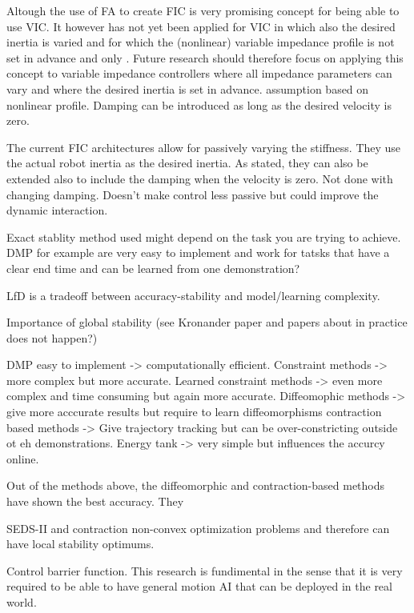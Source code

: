 Altough the use of FA to create FIC is very promising concept for being able to use VIC. It however has not yet been applied for VIC in which also the desired inertia is varied and for which the (nonlinear) variable impedance profile is not set in advance and only . Future research should therefore focus on applying this concept to variable impedance controllers where all impedance parameters can vary and where the desired inertia is set in advance. assumption based on nonlinear profile.
Damping can be introduced as long as the desired velocity is zero.

The current FIC architectures allow for passively varying the stiffness. They use the actual robot inertia as the desired inertia. As stated, they can also be extended also to include the damping when the velocity is zero.
Not done with changing damping. Doesn't make control less passive but could improve the dynamic interaction.


Exact stablity method used might depend on the task you are trying to achieve. DMP for example are very easy to implement and work for tatsks that have a clear end time and can be learned from one demonstration?

LfD is a tradeoff between accuracy-stability and model/learning complexity.

Importance of global stability (see Kronander paper and papers about in practice does not happen?)


DMP easy to implement -> computationally efficient.
Constraint methods -> more complex but more accurate.
Learned constraint methods -> even more complex and time consuming but again more accurate.
Diffeomophic methods -> give more acccurate results but require to learn diffeomorphisms
contraction based methods -> Give trajectory tracking but can be over-constricting outside ot eh demonstrations.
Energy tank -> very simple but influences the accurcy online.

Out of the methods above, the diffeomorphic and contraction-based methods have shown the best accuracy. They 

SEDS-II and contraction non-convex optimization problems and therefore can have local stability optimums.

Control barrier function. This research is fundimental in the sense that it is very required to be able to have general motion AI that can be deployed in the real world.

